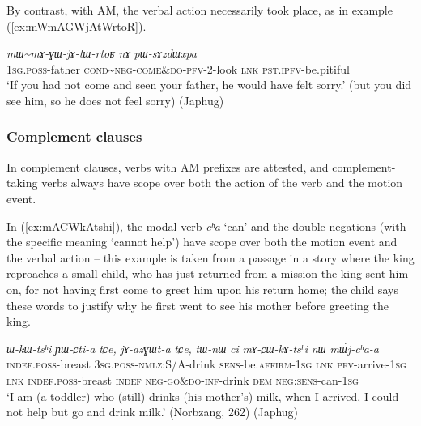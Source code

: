 \documentclass[oneside,a4paper,11pt]{article}
\newcommand{\ipa}[1]{{\phon\textit{#1}}}
\newcommand{\japhug}[2]{\textit{\phon#1} `#2'}
\newcommand{\redp}{\textasciitilde}
\newcommand{\rouge}[1]{{\color{red}#1}}
\begin{document}
By contrast, with AM, the verbal action necessarily took place, as in example (\ref{ex:mWmAGWjAtWrtoR}).

\begin{exe}
\ex \label{ex:mWmAGWjAtWrtoR}
\gll \ipa{nɤ-wa}	\ipa{mɯ\redp{}mɤ-\rouge{ɣɯ}-jɤ-tɯ-rtoʁ}	\ipa{nɤ}	\ipa{pɯ-sɤzdɯxpa} \\
\textsc{1sg.poss}-father \textsc{cond}\redp{}\textsc{neg}-\rouge{\textsc{come\&do}}-\textsc{pfv}-2-look \textsc{lnk} \textsc{pst.ipfv}-be.pitiful \\ 
\glt `If you had not come and seen your father, he would have felt sorry.' (but you did see him, so he does not feel sorry) (Japhug)
\end{exe}

\subsubsection{Complement clauses} \label{sec:am.complement}
In complement clauses, verbs with AM prefixes are attested, and complement-taking verbs always have scope over both the action of the verb and the motion event.

 
In (\ref{ex:mACWkAtshi}), the modal verb \japhug{cʰa}{can} and the double negations (with the specific meaning `cannot help') have scope over both the motion event and the verbal action -- this example is taken from a passage in a story where the king reproaches a small child, who has just returned from a mission the king sent him on, for not having first come to greet him upon his return home; the child says these words to justify why he first went to see his mother before greeting the king.

\begin{exe}
\ex \label{ex:mACWkAtshi}
\gll  \ipa{tɯ-nɯ}	\ipa{ɯ-kɯ-tsʰi}	\ipa{ɲɯ-ɕti-a}	\ipa{tɕe,}	\ipa{jɤ-azɣɯt-a}	\ipa{tɕe,}	\ipa{tɯ-nɯ}	\ipa{ci}	\ipa{mɤ-\rouge{ɕɯ}-kɤ-tsʰi}	\ipa{nɯ}	\ipa{mɯ́j-cʰa-a}  \\
\textsc{indef}.\textsc{poss}-breast \textsc{3sg}.\textsc{poss}-\textsc{nmlz}:S/A-drink \textsc{sens}-be.\textsc{affirm}-\textsc{1sg} \textsc{lnk} \textsc{pfv}-arrive-\textsc{1sg} \textsc{lnk} \textsc{indef}.\textsc{poss}-breast  \textsc{indef} \textsc{neg}-\rouge{\textsc{go\&do}}-\textsc{inf}-drink \textsc{dem} \textsc{neg}:\textsc{sens}-can-\textsc{1sg} \\
\glt `I am (a toddler) who (still) drinks (his mother's) milk, when I arrived, I could not help but go and drink milk.'  (Norbzang, 262) (Japhug)
 \end{exe}
 
\end{document}
